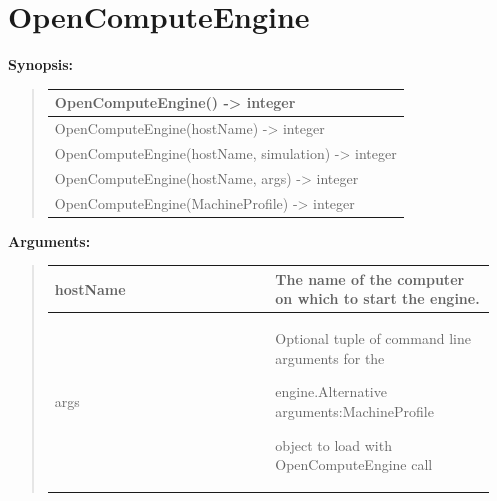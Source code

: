 \documentclass[letterpaper,10pt,english]{sphinxmanual}
\begin{document}
\section{OpenComputeEngine}
\label{functions:opencomputeengine}
\begin{DUlineblock}{0em}
\item[] \textbf{Synopsis:}
\end{DUlineblock}
\begin{quote}

\begin{tabulary}{\linewidth}{|L|}
\hline

OpenComputeEngine() -\textgreater{} integer
\\
\hline
OpenComputeEngine(hostName) -\textgreater{} integer
\\
\hline
OpenComputeEngine(hostName, simulation) -\textgreater{} integer
\\
\hline
OpenComputeEngine(hostName, args) -\textgreater{} integer
\\
\hline
OpenComputeEngine(MachineProfile) -\textgreater{} integer
\\
\hline\end{tabulary}

\end{quote}

\begin{DUlineblock}{0em}
\item[] 
\item[] \textbf{Arguments:}
\end{DUlineblock}
\begin{quote}

\begin{tabular}{|p{0.475\linewidth}|p{0.475\linewidth}|}
\hline

hostName
 & 
The name of the computer on which to start the engine.
\\
\hline
args
 & 
\begin{DUlineblock}{0em}
\item[] Optional tuple of command line arguments for the
\item[] engine.Alternative arguments:MachineProfile
\item[] object to load with OpenComputeEngine call
\end{DUlineblock}
\\
\hline\end{tabular}

\end{quote}
\end{document}
